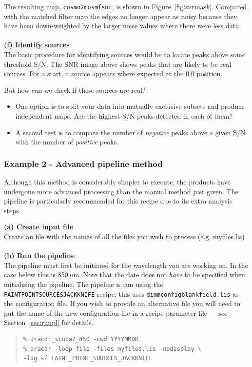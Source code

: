 \documentclass[twoside,11pt]{article}
\newcommand{\htmlref}[2]{#1}
\newcommand{\latexhtml}[2]{#1}
\newcommand{\xref}[3]{#1}
\renewcommand{\_}{\texttt{\symbol{95}}}
\newenvironment{myquote}{\begin{quote}\begin{small}}{\end{small}\end{quote}}
\newcommand{\drrecipe}[1]{\texttt{#1}}
\newcommand{\cref}[3]{\latexhtml{#1~\ref{#2}}{\htmlref{#3}{#2}}}
\begin{document}
The resulting map, \texttt{cosmo2\_mos\_mf\_snr}, is shown in
\cref{Figure}{fig:snrmask}{signal-to-noise image}. Compared with the
matched filter map the
edges no longer appear as noisy because they have been down-weighted
by the larger noise values where there were less data.
\\ \\
\textbf{(f) Identify sources}\\
The basic procedure for identifying sources would be to locate peaks
above some threshold S/N. The SNR image above shows peaks that are
likely to be real sources. For a start, a source appears where
expected at the 0,0 position.

But how can we check if these sources are real?
\begin{itemize}

\item One option is to split your data into mutually exclusive subsets
  and produce independent maps. Are the highest S/N peaks detected in each of
  them?
\item A second test is to compare the number of {\em negative} peaks above
  a given S/N with the number of {\em positive} peaks.
\end{itemize}

\subsubsection{Example 2 - Advanced pipeline method}
\label{sec:jk}

Although this method is considerably simpler to execute, the products
have undergone more advanced processing than the manual method just
given. The pipeline is particularly recommended for this recipe due to
its extra analysis steps.

\textbf{(a) Create input file}\\
Create an file with the names of all the files you wish to process (e.g. myfiles.lis)
\\ \\
\textbf{(b) Run the pipeline}\\
The pipeline must first be initiated for the wavelength you are
working on. In the case below this is 850\,$\mu$m. Note that the date
does not \emph{have} to be specified when initialising the pipeline.
The pipeline is run using the
\xref{\drrecipe{FAINT\_POINT\_SOURCES\_JACKKNIFE}}{sun265}{FAINT_POINT_SOURCES_JACKKNIFE}
recipe; this uses \texttt{dimmconfig\_blank\_field.lis} as the
configuration file. If you wish to provide an alternative file you
will need to put the name of the new configuration file in a recipe
parameter file --- see \cref{Section}{sec:runpl}{The SCUBA-2 Pipeline}
for details.
\begin{myquote}
\begin{verbatim}
% oracdr_scuba2_850 -cwd YYYYMMDD
% oracdr -loop file -files myfiles.lis -nodisplay \
-log sf FAINT_POINT_SOURCES_JACKKNIFE
\end{verbatim}
\end{myquote}
\end{document}
